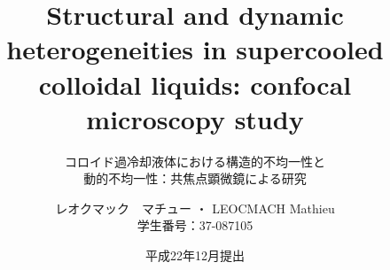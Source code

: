 



\usepackage{natbib, bibentry}
\def\newblock{\hskip .11em plus .33em minus .07em}

\def\simplephasediagram#1{%
	\begin{tikzpicture}[remember picture, xscale=40]
		\tikzset{sim marker/.style={circle, fill=black, inner sep=0, minimum size=0.3em}}
		\tikzset{xp marker/.style={rotate=45, rectangle, draw=black, fill=white, inner sep=0, minimum size=0.5em}}
    	\fill[blue!50] (0.44, -0.4em) rectangle (0.495, 0.4em);
    	\fill[blue!50!red!50] (0.495, -0.4em) rectangle (0.545, 0.4em);
    	\fill[red!50] (0.545, -0.4em) rectangle (0.59, 0.4em);
    	\draw[->, thick] (0.44,0) -- (0.59, 0);
    	\foreach \x in {0.4870, 0.5075,0.5276,0.5481, 0.5678} \node[sim marker] at (\x, 0) (sim\x){};
    	\foreach \x in {0.497, 0.535, 0.555, 0.576} \node[xp marker] at (\x, 0) (exp\x){};
    	#1%
	\end{tikzpicture}%
}

\def\ac#1{#1}
\def\acs#1{#1}

\usepackage[absolute,overlay]{textpos}

\title{Structural and dynamic heterogeneities in supercooled colloidal
liquids: confocal microscopy study}
\subtitle{コロイド過冷却液体における構造的不均一性と\\動的不均一性：共焦点顕微鏡による研究}
\author[M. Leocmach]{レオクマック　マチュー ・ LEOCMACH Mathieu\\学生番号：37-087105}
\date{平成22年12月提出}

%





\begin{frame}[plain]
	\titlepage
\end{frame}

\begin{frame}
	\tableofcontents[hidesubsections]
\end{frame}

